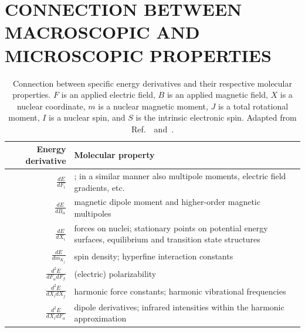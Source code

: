 \documentclass[%
class = book,%
crop = false,%
float = true,%
multi = true,%
preview = false,%
]{standalone}
\newcommand{\caps}[1]{\uppercase{#1}}
\begin{document}

\section[\texorpdfstring{\caps{Macroscopic and Microscopic Response Connections}}{Macroscopic and Microscopic Response Connections}]{\texorpdfstring{\caps{Connection Between Macroscopic and Microscopic Properties}}{Connection Between Macroscopic and Microscopic Properties}}
\label{sec:connection-between-macroscopic-and-microscopic}

\begin{table}
  \centering
  \caption[Connection between energy derivatives and molecular properties]{Connection between specific energy derivatives and their respective molecular properties. \(F\) is an applied electric field, \(B\) is an applied magnetic field, \(X\) is a nuclear coordinate, \(m\) is a nuclear magnetic moment, \(J\) is a total rotational moment, \(I\) is a nuclear spin, and \(S\) is the intrinsic electronic spin. Adapted from Ref.~\parencite{gauss2000}~and~\parencite{jensen2013introduction}.\label{tab:gauss}}
  \begin{singlespace}
    \begin{tabulary}{1.00\textwidth}{rL}
      \toprule
      \textbf{Energy derivative} & \textbf{Molecular property} \\
      \midrule
      \(\frac{dE}{dF_{i}}\)                          & \href{https://chemistry.stackexchange.com/q/31075/194}{\color{black}{dipole moment}}; in a similar manner also multipole moments, electric field gradients, etc. \\
      \(\frac{dE}{dB_{\alpha}}\)                     & magnetic dipole moment and higher-order magnetic multipoles \\
      \(\frac{dE}{dX_{i}}\)                          & forces on nuclei; stationary points on potential energy surfaces, equilibrium and transition state structures \\
      \(\frac{dE}{dm_{K_{j}}}\)                      & spin density; hyperfine interaction constants \\
      \(\frac{d^{2}E}{dF_{\alpha}dF_{\beta}}\)       & (electric) polarizability \\
      \(\frac{d^{2}E}{dX_{i}dX_{j}}\)                & harmonic force constants; harmonic vibrational frequencies \\
      \(\frac{d^{2}E}{dX_{i}dF_{\alpha}}\)           & dipole derivatives; infrared intensities within the harmonic approximation \\

\end{tabulary}
\end{singlespace}
\end{table}
\end{document}
